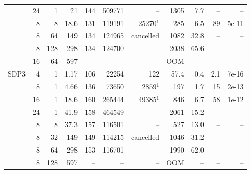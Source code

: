 \begin{tabular}{lrrrrrrrrrr}
 & 24 & 1 & 21 & 144 & 509771 & -- & 1305 & 7.7 & -- & -- \\
 & 8 & 8 & 18.6 & 131 & 119191 & 25270$^1$ & 285 & 6.5 & 89 & 5e-11 \\
 & 8 & 64 & 149 & 134 & 124965 & cancelled & 1082 & 32.8 & -- & -- \\
 & 8 & 128 & 298 & 134 & 124700 & -- & 2038 & 65.6 & -- & -- \\
 & 16 & 64 & 597 & -- & -- & -- & OOM & -- & -- & -- \\
SDP3 & 4 & 1 & 1.17 & 106 & 22254 & 122 & 57.4 & 0.4 & 2.1 & 7e-16 \\
 & 8 & 1 & 4.66 & 136 & 73650 & 2859$^1$ & 197 & 1.7 & 15 & 2e-13 \\
 & 16 & 1 & 18.6 & 160 & 265444 & 49385$^1$ & 846 & 6.7 & 58 & 1e-12 \\
 & 24 & 1 & 41.9 & 158 & 464549 & -- & 2061 & 15.2 & -- & -- \\
 & 8 & 8 & 37.3 & 157 & 116501 & -- & 527 & 13.0 & -- & -- \\
 & 8 & 32 & 149 & 149 & 114215 & cancelled & 1046 & 31.2 & -- & -- \\
 & 8 & 64 & 298 & 153 & 116701 & -- & 1990 & 62.0 & -- & -- \\
 & 8 & 128 & 597 & -- & -- & -- & OOM & -- & -- & -- \\
\hline
\end{tabular}
